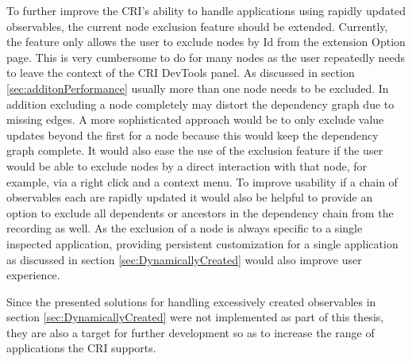 To further improve the CRI's ability to handle applications using rapidly updated observables, the current node exclusion feature should be extended. Currently, the feature only allows the user to exclude nodes by Id from the extension Option page. This is very cumbersome to do for many nodes as the user repeatedly needs to leave the context of the CRI DevTools panel. As discussed in section \ref{sec:additonPerformance} usually more than one node needs to be excluded. In addition excluding a node completely may distort the dependency graph due to missing edges. A more sophisticated approach would be to only exclude value updates beyond the first for a node because this would keep the dependency graph complete. It would also ease the use of the exclusion feature if the user would be able to exclude nodes by a direct interaction with that node, for example, via a right click and a context menu. To improve usability if a chain of observables each are rapidly updated it would also be helpful to provide an option to exclude all dependents or ancestors in the dependency chain from the recording as well.
As the exclusion of a node is always specific to a single inspected application, providing persistent customization for a single application as discussed in section \ref{sec:DynamicallyCreated} would also improve user experience.

Since the presented solutions for handling excessively created observables in section \ref{sec:DynamicallyCreated} were not implemented as part of this thesis, they are also a target for further development so as to increase the range of applications the CRI supports.
 	
